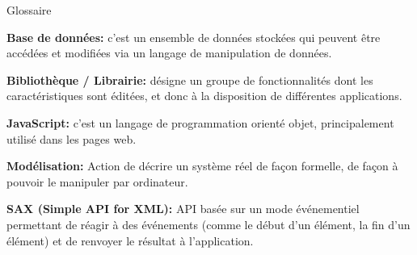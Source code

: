 {\Huge{Glossaire}}

\vspace{2.5cm}
{\bfseries Base de données:} c’est un ensemble de données stockées qui peuvent être accédées et modifiées via un langage de manipulation de données.
\bigskip

{\bfseries Bibliothèque / Librairie:} désigne un groupe de fonctionnalités dont les caractéristiques sont éditées, et donc à la disposition de différentes applications.
\bigskip

{\bfseries JavaScript:} c’est un langage de programmation orienté objet, principalement utilisé dans les pages web.
\bigskip

{\bfseries Modélisation:} Action de décrire un système réel de façon formelle, de façon à pouvoir le manipuler par ordinateur.
\bigskip

{\bfseries SAX (Simple API for XML):} API basée sur un mode événementiel permettant de réagir à des événements (comme le début d'un élément, la fin d'un élément) et de renvoyer le résultat à l'application.
\bigskip

